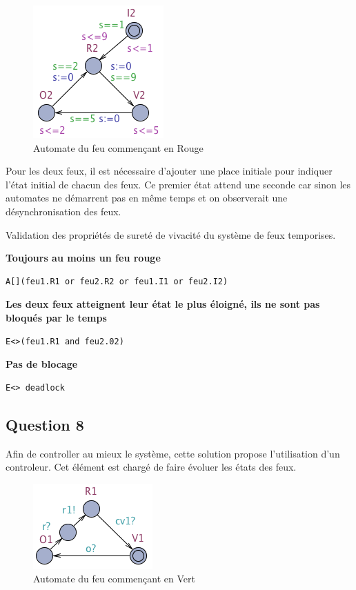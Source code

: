 \documentclass[11pt]{article}
\begin{document}
\begin{figure}[H]
	\centering
	\includegraphics{ressources/part2/Q7-2.png}
	\caption{Automate du feu commençant en Rouge}
\end{figure}

Pour les deux feux, il est nécessaire d'ajouter une place initiale pour indiquer l'état initial de chacun des feux. Ce premier état attend une seconde car sinon les automates ne démarrent pas en même temps et on observerait une désynchronisation des feux.

Validation des propriétés de sureté de vivacité du système de feux temporises.

\textbf{Toujours au moins un feu rouge}
\begin{verbatim}
A[](feu1.R1 or feu2.R2 or feu1.I1 or feu2.I2)
\end{verbatim}

\textbf{Les deux feux atteignent leur état le plus éloigné, ils ne sont pas bloqués par le temps}
\begin{verbatim}
E<>(feu1.R1 and feu2.02)	
\end{verbatim}

\textbf{Pas de blocage}
\begin{verbatim}
E<> deadlock
\end{verbatim}

\subsection{Question 8}

Afin de controller au mieux le système, cette solution propose l'utilisation d'un controleur. Cet élément est chargé de faire évoluer les états des feux. 

\begin{figure}[H]
	\centering
	\includegraphics{ressources/part2/Q8-1.png}
	\caption{Automate du feu commençant en Vert}
\end{figure}
\end{document}
